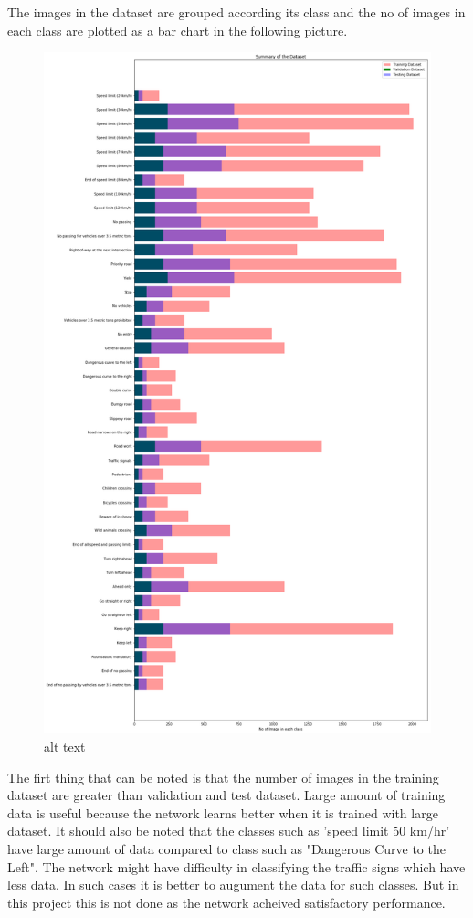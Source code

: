 \documentclass[11pt]{article}
\makeatletter
\def\maxwidth{\ifdim\Gin@nat@width>\linewidth\linewidth
    \else\Gin@nat@width\fi}
\let\Oldincludegraphics\includegraphics
\renewcommand{\includegraphics}[1]{\Oldincludegraphics[width=.8\maxwidth]{#1}}
\makeatother
\begin{document}
The images in the dataset are grouped according its class and the no of
images in each class are plotted as a bar chart in the following
picture.

\begin{figure}
\centering
\includegraphics{./BarChart.png}
\caption{alt text}
\end{figure}

The firt thing that can be noted is that the number of images in the
training dataset are greater than validation and test dataset. Large
amount of training data is useful because the network learns better when
it is trained with large dataset. It should also be noted that the
classes such as 'speed limit 50 km/hr' have large amount of data
compared to class such as "Dangerous Curve to the Left". The network
might have difficulty in classifying the traffic signs which have less
data. In such cases it is better to augument the data for such classes.
But in this project this is not done as the network acheived
satisfactory performance.
\end{document}
